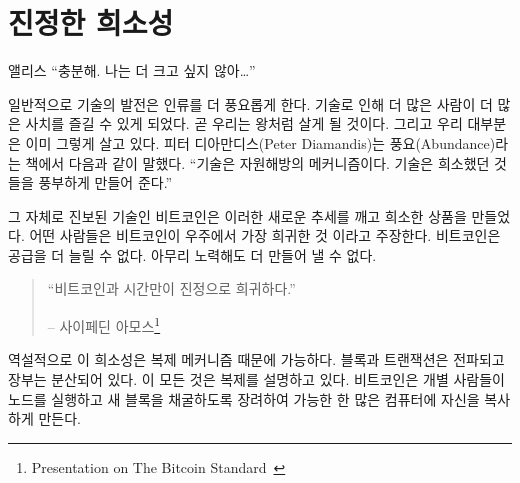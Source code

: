 
\chapter{진정한 희소성}
\label{les:2}

\begin{chapquote}{앨리스}
\enquote{충분해. 나는 더 크고 싶지 않아\ldots}
\end{chapquote}


일반적으로 기술의 발전은 인류를 더 풍요롭게 한다. 기술로 인해 더 많은 사람이 더 많은 사치를 즐길 수 있게 되었다.
곧 우리는 왕처럼 살게 될 것이다. 그리고 우리 대부분은 이미 그렇게 살고 있다.
피터 디아만디스(Peter Diamandis)는 풍요(Abundance)라는 책에서 다음과 같이 말했다\cite{abundance}. \enquote{기술은 자원해방의 메커니즘이다.
기술은 희소했던 것들을 풍부하게 만들어 준다.}

그 자체로 진보된 기술인 비트코인은 이러한 새로운 추세를 깨고 희소한 상품을 만들었다. 
어떤 사람들은 비트코인이 우주에서 가장 희귀한 것 이라고 주장한다.
비트코인은 공급을 더 늘릴 수 없다. 아무리 노력해도 더 만들어 낼 수 없다.

\begin{quotation}\begin{samepage}
\enquote{비트코인과 시간만이 진정으로 희귀하다.}
\begin{flushright} -- 사이페딘 아모스\footnote{Presentation on The Bitcoin Standard~\cite{bitcoinstandard-pres}}
\end{flushright}\end{samepage}\end{quotation}

역설적으로 이 희소성은 복제 메커니즘 때문에 가능하다. 
블록과 트랜잭션은 전파되고 장부는 분산되어 있다. 
이 모든 것은 복제를 설명하고 있다. 
비트코인은 개별 사람들이 노드를 실행하고 새 블록을 채굴하도록 장려하여 
가능한 한 많은 컴퓨터에 자신을 복사하게 만든다.

